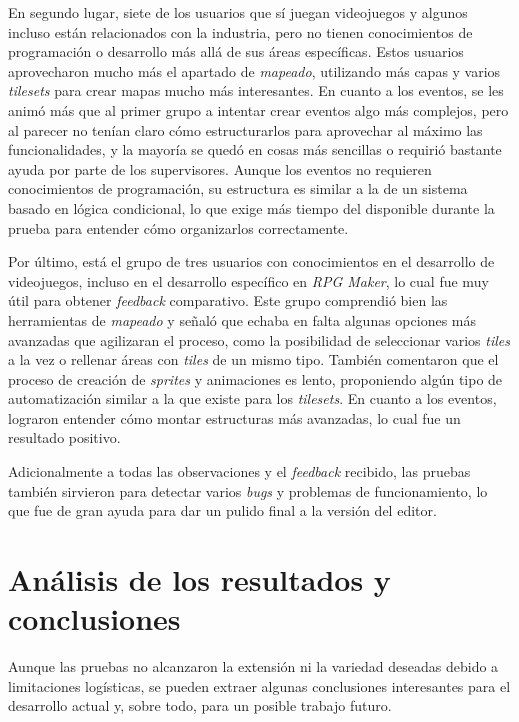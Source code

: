 \medskip

En segundo lugar, siete de los usuarios que sí juegan videojuegos y algunos incluso están relacionados con la industria, pero no tienen conocimientos de programación o desarrollo más allá de sus áreas específicas. Estos usuarios aprovecharon mucho más el apartado de \textit{mapeado}, utilizando más capas y varios \textit{tilesets} para crear mapas mucho más interesantes. En cuanto a los eventos, se les animó más que al primer grupo a intentar crear eventos algo más complejos, pero al parecer no tenían claro cómo estructurarlos para aprovechar al máximo las funcionalidades, y la mayoría se quedó en cosas más sencillas o requirió bastante ayuda por parte de los supervisores. Aunque los eventos no requieren conocimientos de programación, su estructura es similar a la de un sistema basado en lógica condicional, lo que exige más tiempo del disponible durante la prueba para entender cómo organizarlos correctamente.

\medskip

Por último, está el grupo de tres usuarios con conocimientos en el desarrollo de videojuegos, incluso en el desarrollo específico en \textit{RPG Maker}, lo cual fue muy útil para obtener \textit{feedback} comparativo. Este grupo comprendió bien las herramientas de \textit{mapeado} y señaló que echaba en falta algunas opciones más avanzadas que agilizaran el proceso, como la posibilidad de seleccionar varios \textit{tiles} a la vez o rellenar áreas con \textit{tiles} de un mismo tipo. También comentaron que el proceso de creación de \textit{sprites} y animaciones es lento, proponiendo algún tipo de automatización similar a la que existe para los \textit{tilesets}. En cuanto a los eventos, lograron entender cómo montar estructuras más avanzadas, lo cual fue un resultado positivo.

\medskip

Adicionalmente a todas las observaciones y el \textit{feedback} recibido, las pruebas también sirvieron para detectar varios \textit{bugs} y problemas de funcionamiento, lo que fue de gran ayuda para dar un pulido final a la versión del editor.

\section{Análisis de los resultados y conclusiones}
Aunque las pruebas no alcanzaron la extensión ni la variedad deseadas debido a limitaciones logísticas, se pueden extraer algunas conclusiones interesantes para el desarrollo actual y, sobre todo, para un posible trabajo futuro.

